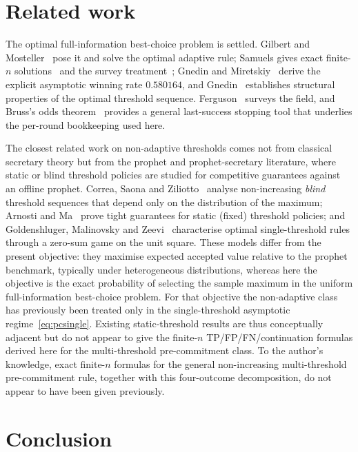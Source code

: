 \documentclass[11pt]{article}
\begin{document}
\section{Related work}\label{sec:related}

The optimal full-information best-choice problem is settled. Gilbert and
Mosteller~\cite{GM1966} pose it and solve the optimal adaptive rule; Samuels gives exact
finite-$n$ solutions~\cite{Samuels1982} and the survey treatment~\cite{Samuels1991};
Gnedin and Miretskiy~\cite{GnedinMiretskiy2007} derive the explicit asymptotic winning
rate $0.580164$, and Gnedin~\cite{Gnedin1996} establishes structural properties of the
optimal threshold sequence. Ferguson~\cite{Ferguson1989} surveys the field, and
Bruss's odds theorem~\cite{Bruss2000} provides a general last-success stopping tool
that underlies the per-round bookkeeping used here.

The closest related work on non-adaptive thresholds comes not from classical secretary
theory but from the prophet and prophet-secretary literature, where static or blind
threshold policies are studied for competitive guarantees against an offline prophet.
Correa, Saona and Ziliotto~\cite{BlindStrategies} analyse non-increasing \emph{blind}
threshold sequences that depend only on the distribution of the maximum; Arnosti and
Ma~\cite{StaticThreshold} prove tight guarantees for static (fixed) threshold policies;
and Goldenshluger, Malinovsky and Zeevi~\cite{SingleThreshold} characterise optimal
single-threshold rules through a zero-sum game on the unit square. These models differ
from the present objective: they maximise expected accepted value relative to the prophet
benchmark, typically under heterogeneous distributions, whereas here the objective is the
exact probability of selecting the sample maximum in the uniform full-information
best-choice problem. For that objective the non-adaptive class has previously been
treated only in the single-threshold asymptotic regime~\eqref{eq:pcsingle}. Existing
static-threshold results are thus conceptually adjacent but do not appear to give the
finite-$n$ TP/FP/FN/continuation formulas derived here for the multi-threshold
pre-commitment class. To the author's knowledge, exact finite-$n$ formulas for the
general non-increasing multi-threshold pre-commitment rule, together with this
four-outcome decomposition, do not appear to have been given previously.

\section{Conclusion}
\end{document}
